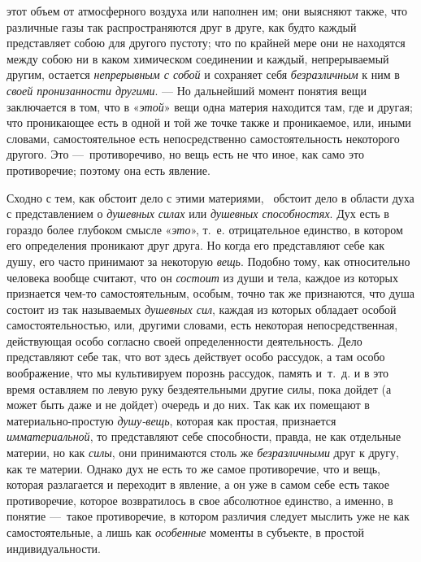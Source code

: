 этот объем от атмосферного воздуха или наполнен им; они выясняют также, что
различные газы так распространяются друг в друге, как будто каждый
представляет собою для другого пустоту; что по крайней мере они не
находятся между собою ни в каком химическом соединении и каждый,
непрерываемый другим, остается {\em непрерывным с
собой} и сохраняет себя {\em безразличным} к ним в
{\em своей пронизанности другими}. — Но дальнейший
момент понятия вещи заключается в том, что в
«{\em этой}» вещи одна материя находится там, где и
другая; что проникающее есть в одной и той же точке также и проникаемое,
или, иными словами, самостоятельное есть непосредственно самостоятельность
некоторого другого. Это —~противоречиво, но вещь есть не что иное, как само
это противоречие; поэтому она есть явление.

Сходно с тем, как обстоит дело с этими материями, \ обстоит дело в области
духа с представлением о {\em душевных силах} или
{\em душевных способностях}. Дух есть в гораздо более
глубоком смысле «{\em это}», т.~е. отрицательное
единство, в котором его определения проникают друг друга. Но когда его
представляют себе как душу, его часто принимают за некоторую
{\em вещь}. Подобно тому, как относительно человека
вообще считают, что он {\em состоит} из души и тела,
каждое из которых признается чем-то самостоятельным, особым, точно так же
признаются, что душа состоит из так называемых
{\em душевных сил}, каждая из которых обладает особой
самостоятельностью, или, другими словами, есть некоторая непосредственная,
действующая особо согласно своей определенности деятельность. Дело
представляют себе так, что вот здесь действует особо рассудок, а там особо
воображение, что мы культивируем порознь рассудок, память и~т.~д. и в это
время оставляем по левую руку бездеятельными другие силы, пока дойдет (а
может быть даже и не дойдет) очередь и до них. Так как их помещают в
материально-простую {\em душу-вещь}, которая как
простая, признается {\em имматериальной}, то
представляют себе способности, правда, не как отдельные материи, но как
{\em силы}, они принимаются столь же
{\em безразличными} друг к другу, как те материи.
Однако дух не есть то же самое противоречие, что и вещь, которая
разлагается и переходит в явление, а он уже в самом себе есть такое
противоречие, которое возвратилось в свое абсолютное единство, а именно, в
понятие —~такое противоречие, в котором различия следует мыслить уже не как
самостоятельные, а лишь как {\em особенные} моменты в
субъекте, в простой индивидуальности.

